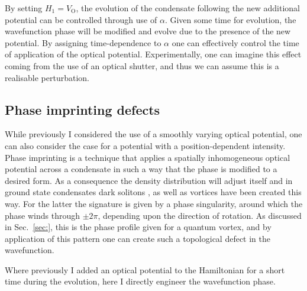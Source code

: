 By setting $H_1 = V_{\textrm{O}}$, the evolution of the condensate following the new additional potential can be controlled through use of $\alpha$. Given some time for evolution, the wavefunction phase will be modified and evolve due to the presence of the new potential. By assigning time-dependence to $\alpha$ one can effectively control the time of application of the optical potential. Experimentally, one can imagine this effect coming from the use of an optical shutter, and thus we can assume this is a realisable perturbation.

\subsection{Phase imprinting defects}\label{sec:phase}

While previously I considered the use of a smoothly varying optical potential, one can also consider the case for a potential with a position-dependent intensity. Phase imprinting is a technique that applies a spatially inhomogeneous optical potential across a condensate in such a way that the phase is modified to a desired form. As a consequence the density distribution will adjust itself and in ground state condensates dark solitons \cite{BEC:Denschlag_science_2000}, as well as vortices \cite{Vtx:Dobrek_pra_1999} have been created this way. For the latter the signature is given by a phase singularity, around which the phase winds through $\pm 2\pi$, depending upon the direction of rotation. As discussed in Sec.~\ref{sec:}, this is the phase profile given for a quantum vortex, and by application of this pattern one can create such a topological defect in the wavefunction.

Where previously I added an optical potential to the Hamiltonian for a short time during the evolution, here I directly engineer the wavefunction phase.

